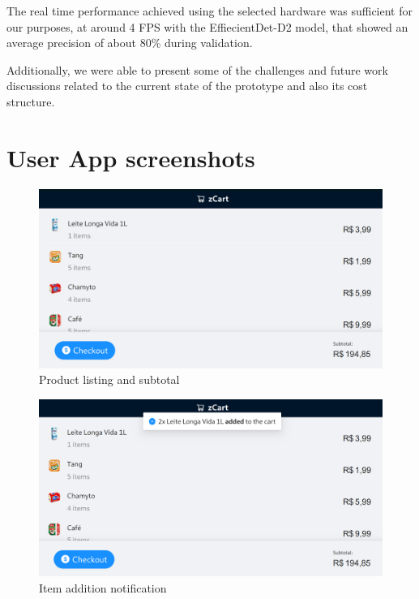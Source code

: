 \documentclass[openright]{normas-utf-tex} %
\begin{document}
The real time performance achieved using the selected hardware was sufficient
for our purposes, at around 4 FPS with the EffiecientDet-D2 model, that showed an
average precision of about 80\% during validation.

Additionally, we were able to present some of the challenges and future work
discussions related to the current state of the prototype and also its cost
structure.


\clearpage
\label{bibstart}

\label{bibend}

\setcounter{chapter}{0}
\apendice
\chapter{User App screenshots}
\label{ap:userapp}

\begin{figure}[H]
	\centering
	\includegraphics[width=1\textwidth]{./images/userapp.png}
	\caption[]{Product listing and subtotal}
\end{figure}

\begin{figure}[H]
	\centering
	\includegraphics[width=1\textwidth]{./images/userapp2.png}
	\caption[]{Item addition notification}
\end{figure}
\end{document}
